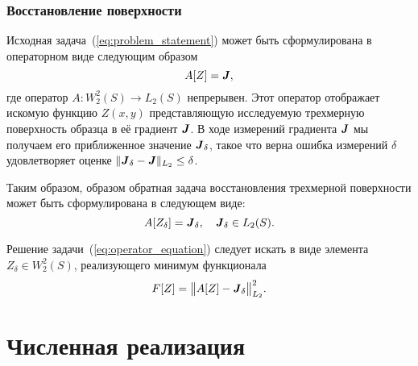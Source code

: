 \documentclass{beamer}
\begin{document}
\begin{frame}[c,allowframebreaks]
    \frametitle{Восстановление поверхности}

    Исходная задача~(\ref{eq:problem_statement}) может быть сформулирована в операторном виде
    следующим образом~\cite{second}
    \begin{equation*}
        \label{operator_equation_0}
        A[Z] = {\textbf{\emph{J}}},
    \end{equation*}
где оператор $A: W_2^2(S) \to L_2(S)$ непрерывен. Этот оператор отображает искомую функцию $Z(x,y)$
представляющую исследуемую трехмерную поверхность образца в её градиент ${\textbf{\emph{J}}}$.
В ходе измерений градиента ${\textbf{\emph{J}}}$ мы получаем его приближенное значение
$\textbf{\emph{J}}_\delta$, такое что верна ошибка измерений $\delta$ удовлетворяет оценке
$\|{\textbf{\emph{J}}}_\delta - {{\textbf{\emph{J}}}}\|_{L_2}\leq\delta$.

    \framebreak

    Таким образом, образом обратная задача восстановления трехмерной поверхности может быть
    сформулирована в следующем виде:
    \begin{equation}
        \label{eq:operator_equation}
        A[Z_\delta] = {\textbf{\emph{J}}}_\delta, \quad {\textbf{\emph{J}}}_\delta \in L_2(S).
    \end{equation}

    Решение задачи~(\ref{eq:operator_equation}) следует искать в виде элемента $Z_\delta \in W_2^2(S)$,
    реализующего минимум функционала
    \begin{equation}
        \label{functional}
        F[Z] = \big\|A[Z] - {\textbf{\emph{J}}}_\delta\big\|_{L_2}^2.
    \end{equation}
\end{frame}




\section{Численная реализация}
\begin{frame}
    \sectionpage
\end{frame}
\end{document}
